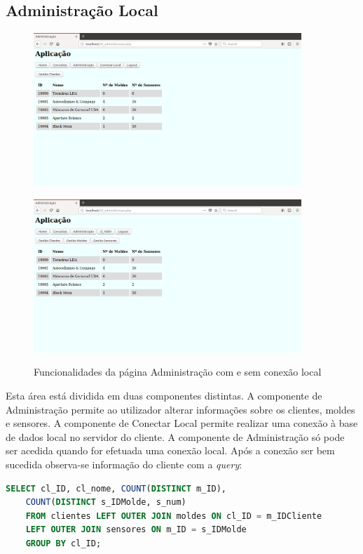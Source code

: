 \documentclass[11pt,twoside,a4paper]{report}
\begin{document}
\subsection{Administração Local}
\begin{figure}[H]
	\centering
	\begin{minipage}{1\textwidth}
		\begin{center}
			\includegraphics[width=0.9\textwidth]{administracao01} %
			\label{fig:admin1}
		\end{center}
	\end{minipage}
	\begin{minipage}{1\textwidth}
		\begin{center}
			\includegraphics[width=0.9\textwidth]{administracao03} %
			\label{fig:admin2}
		\end{center}
	\end{minipage}
	\caption{Funcionalidades da página Administração com e sem conexão local}
	\label{fig:admin0}
\end{figure}
Esta área está dividida em duas componentes distintas. A componente de Administração permite ao utilizador alterar informações sobre os clientes, moldes e sensores. A componente de Conectar Local permite realizar uma conexão à base de dados local no servidor do cliente. A componente de Administração só pode ser acedida quando for efetuada uma conexão local. Após a conexão ser bem sucedida observa-se informação do cliente com a \textit{query}:
\begin{lstlisting}[language = SQL]
	SELECT cl_ID, cl_nome, COUNT(DISTINCT m_ID),
	COUNT(DISTINCT s_IDMolde, s_num)
	FROM clientes LEFT OUTER JOIN moldes ON cl_ID = m_IDCliente
	LEFT OUTER JOIN sensores ON m_ID = s_IDMolde
	GROUP BY cl_ID;
\end{lstlisting}
\end{document}
